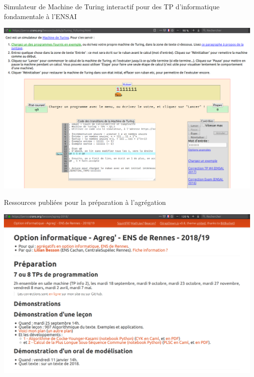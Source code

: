 \documentclass[11pt,english,ignorenonframetext,]{beamer}
\begin{document}
\begin{frame}[plain]
  {Simulateur de Machine de Turing interactif pour des TP d'\textcolor{info}{informatique fondamentale à l'ENSAI}}

\centering
\includegraphics{figures/apercu_ENSAI.png}

\end{frame}

\begin{frame}[plain]{Ressources publiées pour la préparation à l'agrégation}

\centering
\includegraphics{figures/apercu_ENS_agreg_0.png}

\end{frame}
\end{document}
